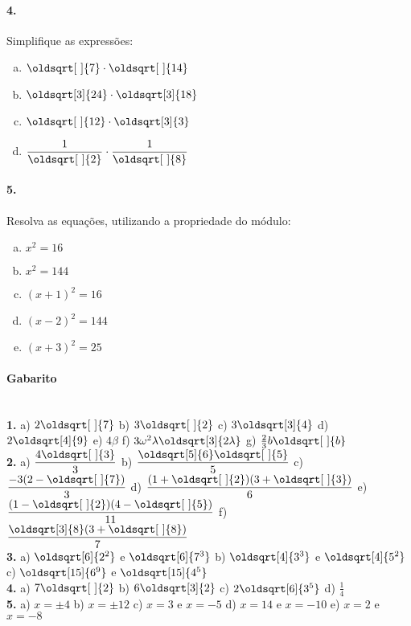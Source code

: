 \documentclass[a4paper,12pt]{article}
\renewcommand*{\sqrt}[2][\ ]{\oldsqrt[#1]{#2}}
\begin{document}
\begin{multicols}{2}
\paragraph*{4.} Simplifique as expressões:
\begin{enumerate}[a)]
    \item $\sqrt{7}\cdot\sqrt{14}$
    \item $\sqrt[3]{24}\cdot\sqrt[3]{18}$
    \item $\sqrt{12}\cdot\sqrt[3]{3}$
    \item $\displaystyle\frac{1}{\sqrt{2}}\cdot \frac{1}{\sqrt{8}}$
\end{enumerate}

\paragraph*{5.} Resolva as equações, utilizando a propriedade do módulo:
\begin{enumerate}[a)]
    \item $x^2 = 16$
    \item $x^2 = 144$
    \item $(x+1)^2 = 16$
    \item $(x-2)^2 = 144$
    \item $(x+3)^2 = 25$
\end{enumerate}
\vspace*{3cm}
\end{multicols}
 
\vspace*{\fill}
{\footnotesize
\paragraph*{Gabarito} \hspace*{\fill}\\
\textbf{1.} a) $2\sqrt{7}$ b) $3\sqrt{2}$ c) $3\sqrt[3]{4}$ d) $2\sqrt[4]{9}$ e) $4\beta$ f) $3\omega^2\lambda\sqrt[3]{2\lambda}$ g) $\frac{2}{3}b\sqrt{b}$ \\[1ex]
\textbf{2.}  a) $\dfrac{4\sqrt{3}}{3}$ b) $\dfrac{\sqrt[5]{6}\sqrt{5}}{5}$ c) $\dfrac{-3(2-\sqrt{7})}{3}$ d) $\dfrac{(1+\sqrt{2})(3+\sqrt{3})}{6}$ e) $\dfrac{(1-\sqrt{2})(4-\sqrt{5})}{11}$ f) $\dfrac{\sqrt[3]{8}(3+\sqrt{8})}{7}$ \\[1ex]
\textbf{3.} a) $\sqrt[6]{2^2}$ e $\sqrt[6]{7^3}$ b) $\sqrt[4]{3^3}$ e $\sqrt[4]{5^2}$ c) $\sqrt[15]{6^9}$ e $\sqrt[15]{4^5}$ \\
\textbf{4.} a) $7\sqrt{2}$ b) $6\sqrt[3]{2}$  c) $2\sqrt[6]{3^5}$  d) $\frac{1}{4}$  \\
\textbf{5.} a) $x = \pm 4$ b) $x = \pm 12$ c) $x = 3$ e $x = -5$ d) $x = 14$ e $x=-10$ e) $x = 2$ e $x = -8$
}
\end{document}
